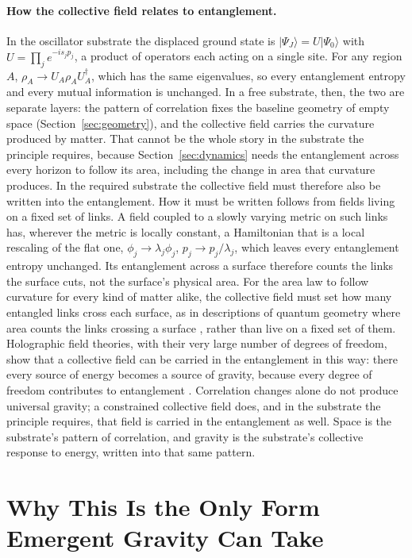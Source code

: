 \documentclass[aps,prd,onecolumn,nofootinbib,superscriptaddress]{revtex4-2}
\begin{document}
\paragraph{How the collective field relates to entanglement.} In the oscillator substrate the displaced ground state is $|\Psi_J\rangle = U|\Psi_0\rangle$ with $U = \prod_j e^{-is_jp_j}$, a product of operators each acting on a single site. For any region $A$, $\rho_A \to U_A\rho_AU_A^\dagger$, which has the same eigenvalues, so every entanglement entropy and every mutual information is unchanged. In a free substrate, then, the two are separate layers: the pattern of correlation fixes the baseline geometry of empty space (Section~\ref{sec:geometry}), and the collective field carries the curvature produced by matter. That cannot be the whole story in the substrate the principle requires, because Section~\ref{sec:dynamics} needs the entanglement across every horizon to follow its area, including the change in area that curvature produces. In the required substrate the collective field must therefore also be written into the entanglement. How it must be written follows from fields living on a fixed set of links. A field coupled to a slowly varying metric on such links has, wherever the metric is locally constant, a Hamiltonian that is a local rescaling of the flat one, $\phi_j \to \lambda_j\phi_j$, $p_j \to p_j/\lambda_j$, which leaves every entanglement entropy unchanged. Its entanglement across a surface therefore counts the links the surface cuts, not the surface's physical area. For the area law to follow curvature for every kind of matter alike, the collective field must set how many entangled links cross each surface, as in descriptions of quantum geometry where area counts the links crossing a surface \cite{rovelli1995}, rather than live on a fixed set of them. Holographic field theories, with their very large number of degrees of freedom, show that a collective field can be carried in the entanglement in this way: there every source of energy becomes a source of gravity, because every degree of freedom contributes to entanglement \cite{swingle2014}. Correlation changes alone do not produce universal gravity; a constrained collective field does, and in the substrate the principle requires, that field is carried in the entanglement as well. Space is the substrate's pattern of correlation, and gravity is the substrate's collective response to energy, written into that same pattern.

\section{Why This Is the Only Form Emergent Gravity Can Take}
\label{sec:ww}
\end{document}
